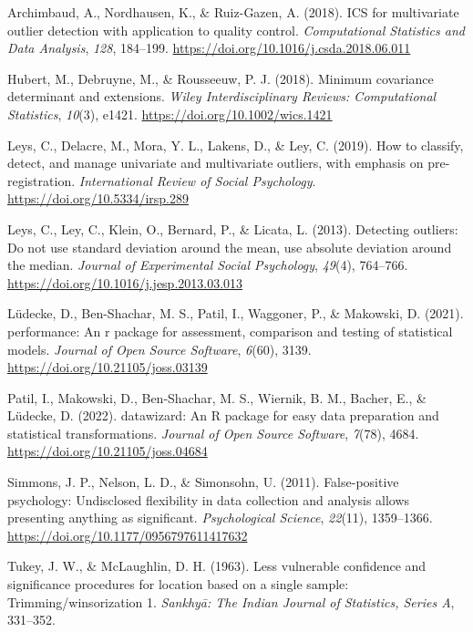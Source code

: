 \documentclass[
]{article}
\newlength{\cslhangindent}
\newlength{\cslentryspacingunit} %
\newenvironment{CSLReferences}[2] %
 {%
  \setlength{\parindent}{0pt}
  \ifodd #1
  \let\oldpar\par
  \def\par{\hangindent=\cslhangindent\oldpar}
  \fi
  \setlength{\parskip}{#2\cslentryspacingunit}
 }%
 {}
\begin{document}
\hypertarget{refs}{}
\begin{CSLReferences}{1}{0}
\leavevmode{}%
Archimbaud, A., Nordhausen, K., \& Ruiz-Gazen, A. (2018). ICS for multivariate outlier detection with application to quality control. \emph{Computational Statistics and Data Analysis}, \emph{128}, 184--199. \url{https://doi.org/10.1016/j.csda.2018.06.011}

\leavevmode{}%
Hubert, M., Debruyne, M., \& Rousseeuw, P. J. (2018). Minimum covariance determinant and extensions. \emph{Wiley Interdisciplinary Reviews: Computational Statistics}, \emph{10}(3), e1421. \url{https://doi.org/10.1002/wics.1421}

\leavevmode{}%
Leys, C., Delacre, M., Mora, Y. L., Lakens, D., \& Ley, C. (2019). How to classify, detect, and manage univariate and multivariate outliers, with emphasis on pre-registration. \emph{International Review of Social Psychology}. \url{https://doi.org/10.5334/irsp.289}

\leavevmode{}%
Leys, C., Ley, C., Klein, O., Bernard, P., \& Licata, L. (2013). Detecting outliers: Do not use standard deviation around the mean, use absolute deviation around the median. \emph{Journal of Experimental Social Psychology}, \emph{49}(4), 764--766. \url{https://doi.org/10.1016/j.jesp.2013.03.013}

\leavevmode{}%
Lüdecke, D., Ben-Shachar, M. S., Patil, I., Waggoner, P., \& Makowski, D. (2021). {performance}: An r package for assessment, comparison and testing of statistical models. \emph{Journal of Open Source Software}, \emph{6}(60), 3139. \url{https://doi.org/10.21105/joss.03139}

\leavevmode{}%
Patil, I., Makowski, D., Ben-Shachar, M. S., Wiernik, B. M., Bacher, E., \& Lüdecke, D. (2022). {datawizard}: An {R} package for easy data preparation and statistical transformations. \emph{Journal of Open Source Software}, \emph{7}(78), 4684. \url{https://doi.org/10.21105/joss.04684}

\leavevmode{}%
Simmons, J. P., Nelson, L. D., \& Simonsohn, U. (2011). False-positive psychology: Undisclosed flexibility in data collection and analysis allows presenting anything as significant. \emph{Psychological Science}, \emph{22}(11), 1359--1366. \url{https://doi.org/10.1177/0956797611417632}

\leavevmode{}%
Tukey, J. W., \& McLaughlin, D. H. (1963). Less vulnerable confidence and significance procedures for location based on a single sample: Trimming/winsorization 1. \emph{Sankhy{ā}: The Indian Journal of Statistics, Series A}, 331--352.

\end{CSLReferences}
\end{document}
